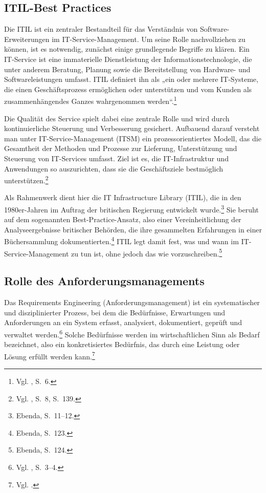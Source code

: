 \documentclass[
    12pt, 
    a4paper,
    ]{scrartcl} %
\begin{document}
\subsection{ITIL-Best Practices}

Die ITIL ist ein zentraler Bestandteil für das Verständnis von Software-Erweiterungen im IT-Service-Management. Um seine Rolle nachvollziehen zu können, ist es notwendig, zunächst einige grundlegende Begriffe zu klären. Ein IT-Service ist eine immaterielle Dienstleistung der Informationstechnologie, die unter anderem Beratung, Planung sowie die Bereitstellung von Hardware- und Softwareleistungen umfasst. ITIL definiert ihn als „ein oder mehrere IT-Systeme, die einen Geschäftsprozess ermöglichen oder unterstützen und vom Kunden als zusammenhängendes Ganzes wahrgenommen werden“.\footnote{Vgl. \cite{S_ITIL}, S.~6.} 

Die Qualität des Service spielt dabei eine zentrale Rolle und wird durch kontinuierliche Steuerung und Verbesserung gesichert. Aufbauend darauf versteht man unter IT-Service-Management (ITSM) ein prozessorientiertes Modell, das die Gesamtheit der Methoden und Prozesse zur Lieferung, Unterstützung und Steuerung von IT-Services umfasst. Ziel ist es, die IT-Infrastruktur und Anwendungen so auszurichten, dass sie die Geschäftsziele bestmöglich unterstützen.\footnote{Vgl. \cite{S_ITIL}, S.~8, S.~139.}

Als Rahmenwerk dient hier die IT Infrastructure Library (ITIL), die in den 1980er-Jahren im Auftrag der britischen Regierung entwickelt wurde.\footnote{Ebenda, S.~11--12.} Sie beruht auf dem sogenannten Best-Practice-Ansatz, also einer Vereinheitlichung der Analyseergebnisse britischer Behörden, die ihre gesammelten Erfahrungen in einer Büchersammlung dokumentierten.\footnote{Ebenda, S.~123.} ITIL legt damit fest, was und wann im IT-Service-Management zu tun ist, ohne jedoch das wie vorzuschreiben.\footnote{Ebenda, S.~124.} 

\subsection{Rolle des Anforderungsmanagements}

Das Requirements Engineering (Anforderungsmanagement) ist ein systematischer und disziplinierter Prozess, bei dem die Bedürfnisse, Erwartungen und Anforderungen an ein System erfasst, analysiert, dokumentiert, geprüft und verwaltet werden.\footnote{Vgl. \cite{S_PohlRupp}, S.~3--4.} Solche Bedürfnisse werden im wirtschaftlichen Sinn als Bedarf bezeichnet, also ein konkretisiertes Bedürfnis, das durch eine Leistung oder Lösung erfüllt werden kann.\footnote{Vgl. \cite{S_WikipediaBedarf}.}
\end{document}
